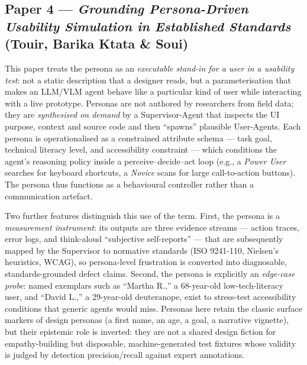 

\subsection*{Paper 4 --- \textit{Grounding Persona-Driven Usability Simulation in Established Standards} (Touir, Barika Ktata \& Soui)}

This paper treats the persona as an \emph{executable stand-in for a user in a usability
test}: not a static description that a designer reads, but a parameterisation that makes an
LLM/VLM agent behave like a particular kind of user while interacting with a live prototype.
Personas are not authored by researchers from field data; they are \emph{synthesised on demand}
by a Supervisor-Agent that inspects the UI purpose, context and source code and then
``spawns'' plausible User-Agents. Each persona is operationalised as a constrained attribute
schema --- task goal, technical literacy level, and accessibility constraint --- which
conditions the agent's reasoning policy inside a perceive--decide--act loop (e.g., a
\textit{Power User} searches for keyboard shortcuts, a \textit{Novice} scans for large
call-to-action buttons). The persona thus functions as a behavioural controller rather than a
communication artefact.

Two further features distinguish this use of the term. First, the persona is a
\emph{measurement instrument}: its outputs are three evidence streams --- action traces, error
logs, and think-aloud ``subjective self-reports'' --- that are subsequently mapped by the
Supervisor to normative standards (ISO 9241-110, Nielsen's heuristics, WCAG), so persona-level
frustration is converted into diagnosable, standards-grounded defect claims. Second, the
persona is explicitly an \emph{edge-case probe}: named exemplars such as ``Martha R.,'' a
68-year-old low-tech-literacy user, and ``David L.,'' a 29-year-old deuteranope, exist to
stress-test accessibility conditions that generic agents would miss. Personas here retain the
classic surface markers of design personas (a first name, an age, a goal, a narrative
vignette), but their epistemic role is inverted: they are not a shared design fiction for
empathy-building but disposable, machine-generated test fixtures whose validity is judged by
detection precision/recall against expert annotations.

